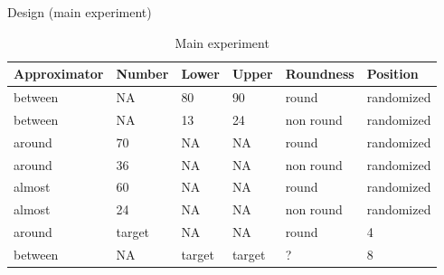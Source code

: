 \documentclass[xcolor=table, hyperref={pdfpagelabels=false}]{beamer}
\begin{document}
\begin{frame}{Design (main experiment)}
\setlength\tabcolsep{2pt}  %
	\begin{table}[H]
		\centering
		\begin{tabular}{l|lllll}
			Approximator                        & Number & Lower & Upper & Roundness & Position  \\ \hline
			between                             & NA     & 80          & 90           & round &  randomized\\
			between                              & NA     & 13          & 24           & non round & randomized\\
			around                              & 70     & NA          & NA           & round & randomized\\
			around                              & 36     & NA          & NA           & non round & randomized\\
			almost                              & 60     & NA          & NA           & round & randomized\\
			almost                              & 24     & NA          & NA           & non round & randomized\\
			\rowcolor[rgb]{0.8,0.8,0.8} around  & target & NA          & NA           & round & 4\\
			\rowcolor[rgb]{0.8,0.8,0.8} between & NA     & target      & target    & ? & 8  
		\end{tabular}
		\caption{Main experiment}
	\end{table}
\end{frame}
\end{document}
